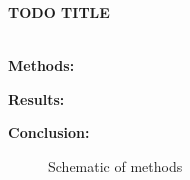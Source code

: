 \documentclass[11pt,a4paper]{article}
\renewcommand{\title}[1]{\textbf{#1}\\}
\newcommand{\authors}[1]{\iftoggle{anonymous}{\phantom{#1}}{#1}\\}
\newcommand{\email}[1]{\iftoggle{anonymous}{\phantom{#1}}{#1}}
\begin{document}


\title{TODO TITLE}
\authors{Veronica Boyce, Ilaria Chen, Bobby Sparks, Malia Perez, Michael C. Frank} 
\email{vboyce@stanford.edu;  Stanford University}
\newline
%



\textbf{Methods:} 


\textbf{Results:} 

\textbf{Conclusion:} 

\newpage

\begin{figure}

	\caption{Schematic of methods}
\end{figure}
\end{document}
